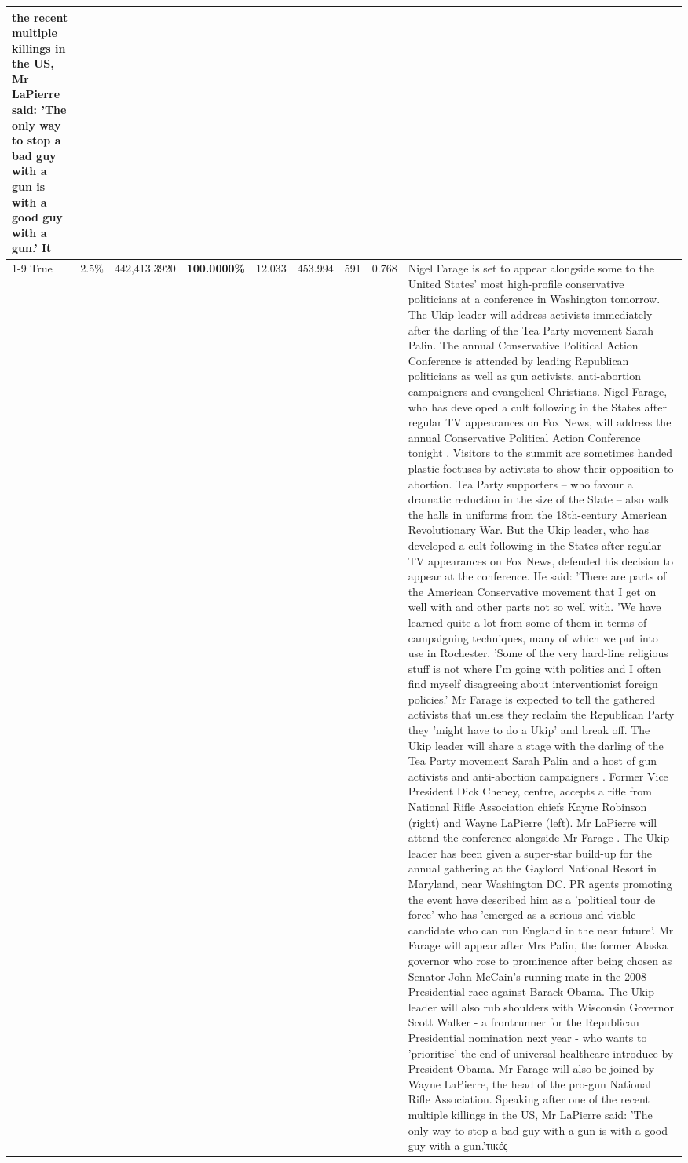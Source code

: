 \begin{table}[H]
\begin{tabular}{lllrlllll}
the recent multiple killings in the US, Mr LaPierre said: 'The only way to stop a bad guy with a gun is with a good guy with a gun.' It \\
\cline{1-9}
True & 2.5\% & 442,413.3920 & \bfseries \color{red} 100.0000\% & 12.033 & 453.994 & 591 & 0.768 & Nigel Farage is set to appear alongside some to the United States' most high-profile conservative politicians at a conference in Washington tomorrow. The Ukip leader will address activists immediately after the darling of the Tea Party movement Sarah Palin. The annual Conservative Political Action Conference is attended by leading Republican politicians as well as gun activists, anti-abortion campaigners and evangelical Christians. Nigel Farage, who has developed a cult following in the States after regular TV appearances on Fox News, will address the annual Conservative Political Action Conference tonight . Visitors to the summit are sometimes handed plastic foetuses by activists to show their opposition to abortion. Tea Party supporters – who favour a dramatic reduction in the size of the State – also walk the halls in uniforms from the 18th-century American Revolutionary War. But the Ukip leader, who has developed a cult following in the States after regular TV appearances on Fox News, defended his decision to appear at the conference. He said: 'There are parts of the American Conservative movement that I get on well with and other parts not so well with. 'We have learned quite a lot from some of them in terms of campaigning techniques, many of which we put into use in Rochester. 'Some of the very hard-line religious stuff is not where I'm going with politics and I often find myself disagreeing about interventionist foreign policies.' Mr Farage is expected to tell the gathered activists that unless they reclaim the Republican Party they 'might have to do a Ukip' and break off. The Ukip leader will share a stage with the darling of the Tea Party movement Sarah Palin and a host of gun activists and anti-abortion campaigners . Former Vice President Dick Cheney, centre, accepts a rifle from National Rifle Association chiefs Kayne Robinson (right) and Wayne LaPierre (left). Mr LaPierre will attend the conference alongside Mr Farage . The Ukip leader has been given a super-star build-up for the annual gathering at the Gaylord National Resort in Maryland, near Washington DC. PR agents promoting the event have described him as a 'political tour de force' who has 'emerged as a serious and viable candidate who can run England in the near future'. Mr Farage will appear after Mrs Palin, the former Alaska governor who rose to prominence after being chosen as Senator John McCain's running mate in the 2008 Presidential race against Barack Obama. The Ukip leader will also rub shoulders with Wisconsin Governor Scott Walker - a frontrunner for the Republican Presidential nomination next year - who wants to 'prioritise' the end of universal healthcare introduce by President Obama. Mr Farage will also be joined by Wayne LaPierre, the head of the pro-gun National Rifle Association. Speaking after one of the recent multiple killings in the US, Mr LaPierre said: 'The only way to stop a bad guy with a gun is with a good guy with a gun.'τικές \\

\end{tabular}
\end{table}
